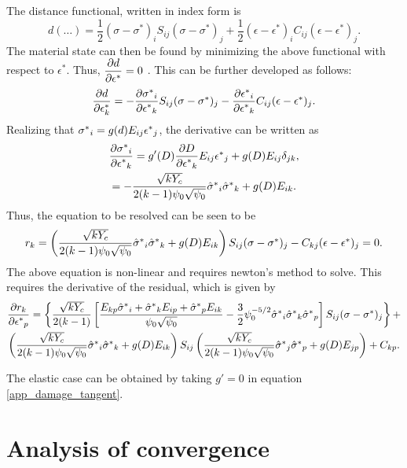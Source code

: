 \documentclass[10pt,review]{cas-sc}
\begin{document}
The distance functional, written in index form is
\begin{equation}
	d(\dots) = \frac{1}{2}(\sigma-\sigma^*)_i S_{ij} (\sigma-\sigma^*)_j + \frac{1}{2} (\epsilon-\epsilon^*)_i C_{ij} (\epsilon-\epsilon^*)_j.
\end{equation}
The material state can then be found by minimizing the above functional with respect to $\epsilon^*$. Thus, ${\dfrac{\partial d}{\partial \epsilon ^*}}=0$ . This can be further developed as follows:
\begin{equation}
	{\dfrac{\partial d}{\partial \epsilon ^*_k}} = -{\dfrac{\partial \mbox{$\sigma^*$}_i}{\partial \mbox{$\epsilon^*$}_k}} S_{ij} ({\sigma} - \mbox{$\sigma^*$})_j - {\dfrac{\partial \mbox{$\epsilon^*$}_i}{\partial \mbox{$\epsilon^*$}_k}} C_{ij}({\epsilon}-\mbox{$\epsilon^*$})_j.
\end{equation}
Realizing that $\mbox{$\sigma^*$}_i = g(d) E_{ij} \mbox{$\epsilon^*$}_j$, the derivative can be written as 
\begin{gather}
	{\dfrac{\partial  \mbox{$\sigma^*$}_i}{\partial  \mbox{$\epsilon^*$}_k}} = g'(D) {\dfrac{\partial D}{\partial \mbox{$\epsilon^*$}_k}} E_{ij} \mbox{$\epsilon^*$}_j + g(D) E_{ij} \delta_{jk},  \label{app_damage_tangent} \\
	= -\frac{\sqrt{k Y_c}}{2(k-1)\psi_0 \sqrt{\psi_0}} \mbox{$\hat{\sigma}^*$}_i \mbox{$\hat{\sigma}^*$}_k + g(D) E_{ik}.
\end{gather}
Thus, the equation to be resolved can be seen to be
\begin{equation}
	r_k = \left(\frac{\sqrt{k Y_c}}{2(k-1)\psi_0 \sqrt{\psi_0}} \mbox{$\hat{\sigma}^*$}_i \mbox{$\hat{\sigma}^*$}_k + g(D) E_{ik} \right) S_{ij} ({\sigma} - \mbox{$\sigma^*$})_j -  C_{kj}({\epsilon}-\mbox{$\epsilon^*$})_j = 0.\label{app_residual}
\end{equation}
The above equation is non-linear and requires newton's method to solve. This requires the derivative of the residual, which is given by
\begin{multline}
	{\dfrac{\partial r_k}{\partial  \mbox{$\epsilon^*$}_p}} = \left\{  \frac{\sqrt{k Y_c}}{2(k-1)} \left[ \frac{ E_{kp} \mbox{$\hat{\sigma}^*$}_i + \mbox{$\hat{\sigma}^*$}_k E_{ip} + \mbox{$\hat{\sigma}^*$}_p E_{ik} }{\psi_0 \sqrt{\psi_0}}-\frac{3}{2} \psi_0^{-5/2} \mbox{$\hat{\sigma}^*$}_i \mbox{$\hat{\sigma}^*$}_k \mbox{$\hat{\sigma}^*$}_p \right] S_{ij} ({\sigma} - \mbox{$\sigma^*$})_j  \right\} +  \\ 
	\left(\frac{\sqrt{k Y_c}}{2(k-1)\psi_0 \sqrt{\psi_0}} \mbox{$\hat{\sigma}^*$}_i \mbox{$\hat{\sigma}^*$}_k + g(D) E_{ik} \right) S_{ij} \left(\frac{\sqrt{k Y_c}}{2(k-1)\psi_0 \sqrt{\psi_0}} \mbox{$\hat{\sigma}^*$}_j \mbox{$\hat{\sigma}^*$}_p + g(D) E_{jp} \right) + C_{kp}.  \label{app_hessian}
\end{multline}

The elastic case can be obtained by taking $g'=0$ in equation \ref{app_damage_tangent}. 

\section{Analysis of convergence \label{appx_convergence}}
\end{document}
